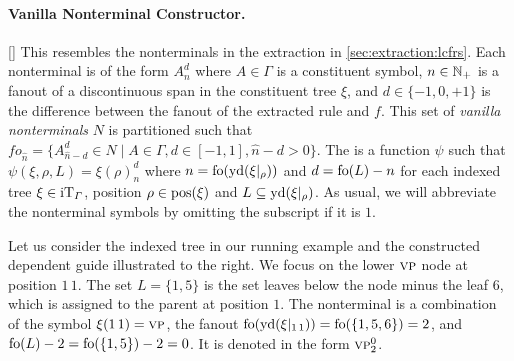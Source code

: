 \documentclass[../../document.tex]{subfiles}
\begin{document}
    \paragraph{Vanilla Nonterminal Constructor.}[]
    This resembles the nonterminals in the extraction in \cref{sec:extraction:lcfrs}.
    Each nonterminal is of the form \(A_{n}^{d}\) where \(A \in \varGamma\) is a constituent symbol, \(n \in \mathbb{N}_+\) is a fanout of a discontinuous span in the constituent tree \(\xi\), and \(d \in \{-1,0,+1\}\) is the difference between the fanout of the extracted rule and \(f\).
    This set of \emph{vanilla nonterminals} \(N\) is partitioned such that \(\mathit{fo}_{\hat{n}} = \{ A^d_{\hat{n}-d} \in N \mid A \in \varGamma, d \in [-1,1], \hat{n}-d > 0 \}\).
    The  is a function \(\psi\) such that \(\psi(\xi, \rho, L) = \xi(\rho)_{n}^{d}\) where \(n = \operatorname{fo}(\operatorname{yd}(\xi|_\rho))\) and \(d = \operatorname{fo}(L) - n\) for each indexed tree \(\xi \in \operatorname{iT}_\varGamma\), position \(\rho \in \operatorname{pos}(\xi)\) and \(L \subseteq \operatorname{yd}(\xi|_\rho)\).
    As usual, we will abbreviate the nonterminal symbols by omitting the subscript if it is \(1\).

    \begin{wrapfigure}[6]{r}{0pt}
        
    \end{wrapfigure}
    Let us consider the indexed tree in our running example and the constructed dependent guide illustrated to the right.
    We focus on the lower \(\textsc{vp}\) node at position \(1\,1\).
    The set \(L= \{1,5\}\) is the set leaves below the node minus the leaf \(6\), which is assigned to the parent at position \(1\).
    The nonterminal is a combination of the symbol \(\xi(1\,1) = \textsc{vp}\), the fanout \(\operatorname{fo}(\operatorname{yd}(\xi|_{1\,1})) = \operatorname{fo}(\{1,5,6\}) = 2\), and \(\operatorname{fo}(L) - 2 = \operatorname{fo}(\{1,5\})-2=0\).
    It is denoted in the form \(\textsc{vp}^0_2\).
    \exampleqed
\end{document}
